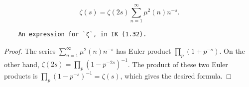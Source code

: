 \begin{theorem}
\label{zeta_alt}
\leanok
$$\zeta(s) =\zeta(2s) \sum_{n=1}^{\infty}\mu^2(n)n^{-s}.$$
  \begin{verbatim}
    An expression for `ζ`, in IK (1.32).
  \end{verbatim}
\end{theorem}
\begin{proof}
\leanok
The series $\sum_{n=1}^{\infty}\mu^2(n)n^{-s}$ has Euler product $\prod_{p} (1 + p^{-s})$. On the other hand, $\zeta(2s)=\prod_p (1 - p^{-2s})^{-1}$. The product of these two Euler products is $\prod_p (1 - p^{-s})^{-1} = \zeta(s)$, which gives the desired formula.
\end{proof}
